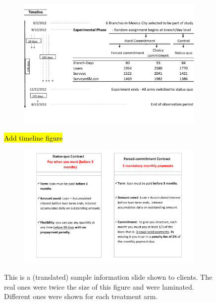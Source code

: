 \documentclass[oneside,11pt]{article}
\begin{document}
\begin{figure}[H]
     \caption{Experiment description}
    \label{exp_description}
\begin{center}
\begin{subfigure}{\textwidth}
        \includegraphics[width=\textwidth]{Figuras/consort.pdf}
    \end{subfigure}
  \end{center}
    \scriptsize 
    \hl{Add timeline figure}
\end{figure}



\begin{figure}[H]
     \caption{Explanatory Material}
    \label{ExplanatoryMaterial}
    \begin{center}
    \begin{subfigure}{\textwidth}
        \centering
        \includegraphics[width=\textwidth]{Figuras/micas.pdf}
    \end{subfigure}
    \end{center}
    \scriptsize
        This is a (translated) sample information slide shown to clients. The real ones were twice the size of this figure and were laminated. Different ones were shown for each treatment arm.
\end{figure}
\end{document}
